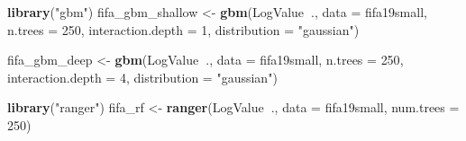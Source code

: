\documentclass[12pt,]{krantz}
\newenvironment{Shaded}{\begin{snugshade}}{\end{snugshade}}
\newcommand{\DataTypeTok}[1]{\textcolor[rgb]{0.13,0.29,0.53}{#1}}
\newcommand{\DecValTok}[1]{\textcolor[rgb]{0.00,0.00,0.81}{#1}}
\newcommand{\KeywordTok}[1]{\textcolor[rgb]{0.13,0.29,0.53}{\textbf{#1}}}
\newcommand{\NormalTok}[1]{#1}
\newcommand{\OperatorTok}[1]{\textcolor[rgb]{0.81,0.36,0.00}{\textbf{#1}}}
\newcommand{\StringTok}[1]{\textcolor[rgb]{0.31,0.60,0.02}{#1}}
\begin{document}
\begin{Shaded}
\begin{Highlighting}[]
\KeywordTok{library}\NormalTok{(}\StringTok{"gbm"}\NormalTok{)}
\NormalTok{fifa_gbm_shallow <-}\StringTok{ }\KeywordTok{gbm}\NormalTok{(LogValue}\OperatorTok{~}\NormalTok{., }\DataTypeTok{data =}\NormalTok{ fifa19small, }\DataTypeTok{n.trees =} \DecValTok{250}\NormalTok{, }\DataTypeTok{interaction.depth =} \DecValTok{1}\NormalTok{, }\DataTypeTok{distribution =} \StringTok{"gaussian"}\NormalTok{)}

\NormalTok{fifa_gbm_deep <-}\StringTok{ }\KeywordTok{gbm}\NormalTok{(LogValue}\OperatorTok{~}\NormalTok{., }\DataTypeTok{data =}\NormalTok{ fifa19small, }\DataTypeTok{n.trees =} \DecValTok{250}\NormalTok{, }\DataTypeTok{interaction.depth =} \DecValTok{4}\NormalTok{, }\DataTypeTok{distribution =} \StringTok{"gaussian"}\NormalTok{)}

\KeywordTok{library}\NormalTok{(}\StringTok{"ranger"}\NormalTok{)}
\NormalTok{fifa_rf <-}\StringTok{ }\KeywordTok{ranger}\NormalTok{(LogValue}\OperatorTok{~}\NormalTok{., }\DataTypeTok{data =}\NormalTok{ fifa19small, }\DataTypeTok{num.trees =} \DecValTok{250}\NormalTok{)}


\end{Highlighting}
\end{Shaded}
\end{document}
